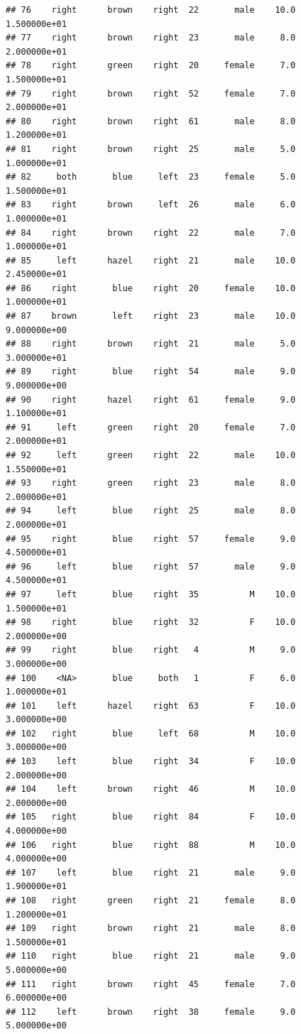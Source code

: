 \documentclass[]{article}
\begin{document}
\begin{verbatim}
## 76    right      brown    right  22       male    10.0  1.500000e+01
## 77    right      brown    right  23       male     8.0  2.000000e+01
## 78    right      green    right  20     female     7.0  1.500000e+01
## 79    right      brown    right  52     female     7.0  2.000000e+01
## 80    right      brown    right  61       male     8.0  1.200000e+01
## 81    right      brown    right  25       male     5.0  1.000000e+01
## 82     both       blue     left  23     female     5.0  1.500000e+01
## 83    right      brown     left  26       male     6.0  1.000000e+01
## 84    right      brown    right  22       male     7.0  1.000000e+01
## 85     left      hazel    right  21       male    10.0  2.450000e+01
## 86    right       blue    right  20     female    10.0  1.000000e+01
## 87    brown       left    right  23       male    10.0  9.000000e+00
## 88    right      brown    right  21       male     5.0  3.000000e+01
## 89    right       blue    right  54       male     9.0  9.000000e+00
## 90    right      hazel    right  61     female     9.0  1.100000e+01
## 91     left      green    right  20     female     7.0  2.000000e+01
## 92     left      green    right  22       male    10.0  1.550000e+01
## 93    right      green    right  23       male     8.0  2.000000e+01
## 94     left       blue    right  25       male     8.0  2.000000e+01
## 95    right       blue    right  57     female     9.0  4.500000e+01
## 96     left       blue    right  57       male     9.0  4.500000e+01
## 97     left       blue    right  35          M    10.0  1.500000e+01
## 98    right       blue    right  32          F    10.0  2.000000e+00
## 99    right       blue    right   4          M     9.0  3.000000e+00
## 100    <NA>       blue     both   1          F     6.0  1.000000e+01
## 101    left      hazel    right  63          F    10.0  3.000000e+00
## 102   right       blue     left  68          M    10.0  3.000000e+00
## 103    left       blue    right  34          F    10.0  2.000000e+00
## 104    left      brown    right  46          M    10.0  2.000000e+00
## 105   right       blue    right  84          F    10.0  4.000000e+00
## 106   right       blue    right  88          M    10.0  4.000000e+00
## 107    left       blue    right  21       male     9.0  1.900000e+01
## 108   right      green    right  21     female     8.0  1.200000e+01
## 109   right      brown    right  21       male     8.0  1.500000e+01
## 110   right       blue    right  21       male     9.0  5.000000e+00
## 111   right      brown    right  45     female     7.0  6.000000e+00
## 112    left      brown    right  38     female     9.0  5.000000e+00

\end{verbatim}
\end{document}

